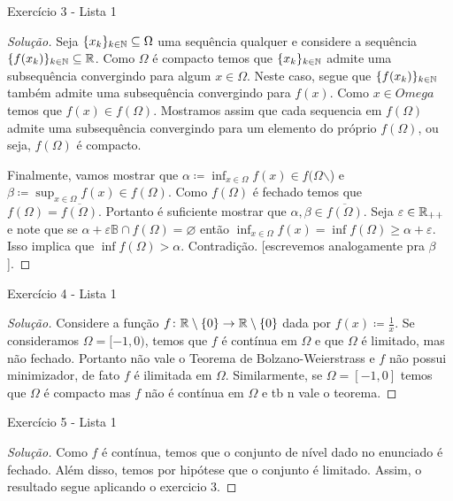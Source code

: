 \documentclass[12pt,twoside,a4paper]{article}
\begin{document}
\begin{problema}
Exercício 3 - Lista 1 
\end{problema}
\begin{proof}[Solução]
 
Seja \(\{x_k\}_{k\in\mathbb{N}}\subseteq \Omega\) uma sequência qualquer e
considere a sequência \(\{f(x_k)\}_{k\in\mathbb{N}}\subseteq\mathbb{R}\). Como
\(\Omega\) é compacto temos que \(\{x_k\}_{k\in \mathbb{N}}\) admite uma
subsequência convergindo para algum \(x\in\Omega\). Neste caso, segue que
\(\{f(x_k)\}_{k\in\mathbb{N}}\) também admite uma subsequência convergindo
para \(f(x)\). Como \(x\in Omega\) temos que
\(f(x)\in f(\Omega)\). Mostramos
assim que cada sequencia em \(f(\Omega)\) admite uma
subsequência convergindo
para um elemento do próprio \(f(\Omega)\), ou seja, \(f(\Omega)\) é
compacto.

Finalmente, vamos mostrar que \(\alpha\coloneqq\inf_{x\in\Omega}f(x)\in
f(\Omega\)$\backslash$) e
\(\beta\coloneqq\sup_{x\in\Omega}f(x)\in f(\Omega)\).
Como \(f(\Omega)\) é fechado temos que
\(f(\Omega)=\overline{f(\Omega)}\). Portanto é suficiente mostrar que 
\(\alpha,\beta\in\overline{f(\Omega)}\). Seja
\(\varepsilon\in\mathbb{R}_{++}\) e note que se
\(\alpha +\varepsilon\mathbb{B}\cap f(\Omega)=\varnothing\)
então \(\inf_{x\in\Omega}f(x)=\inf f(\Omega)\geq\alpha+\varepsilon\).
Isso implica que \(\inf f(\Omega) > \alpha\).
Contradição. [escrevemos analogamente pra \(\beta\)].
\end{proof}

\begin{problema}
Exercício 4 - Lista 1
\end{problema}
\begin{proof}[Solução]
  Considere a função
  \(f\colon\mathbb{R}\setminus\{0\}\to\mathbb{R}\setminus\{0\}\)
  dada por \(f(x)\coloneqq\frac{1}{x}\). Se consideramos
  \(\Omega=[-1,0)\), temos que \(f\) é contínua em \(\Omega\) e
  que \(\Omega\) é limitado, mas não fechado.
  Portanto não vale o Teorema de Bolzano-Weierstrass e \(f\) não possui
  minimizador, de fato \(f\) é ilimitada em \(\Omega\).
  Similarmente, se \(\Omega=[-1,0]\) temos que \(\Omega\) é compacto
  mas \(f\) não é contínua em \(\Omega\) e tb n vale o teorema.
\end{proof}

\begin{problema}
Exercício 5 - Lista 1   
\end{problema}
\begin{proof}[Solução]
  Como \(f\) é contínua, temos que o conjunto de nível
  dado no enunciado é fechado. Além disso, temos
  por hipótese que o conjunto é limitado. Assim, o
  resultado segue aplicando o exercicio 3.
\end{proof}
\end{document}
